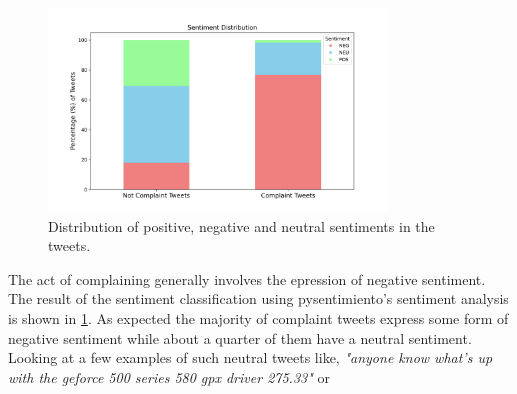 \begin{figure}[htb]
    \centering
    \includegraphics[width=9cm]{figures/sentiment.png}
    \vspace*{-3mm}
    \caption{Distribution of positive, negative and neutral sentiments in the tweets.}
    \label{fig: sentiment}
\end{figure}

The act of complaining generally involves the epression of negative sentiment. The result of the sentiment classification using pysentimiento's sentiment analysis \cite{perezPysentimientoPythonToolkit2021} is shown in \ref{fig: sentiment}. As expected the majority of complaint tweets express some form of negative sentiment while about a quarter of them have a neutral sentiment. Looking at a few examples of such neutral tweets like, \textit{"anyone know what's up with the geforce 500 series 580 gpx driver 275.33"} or 

